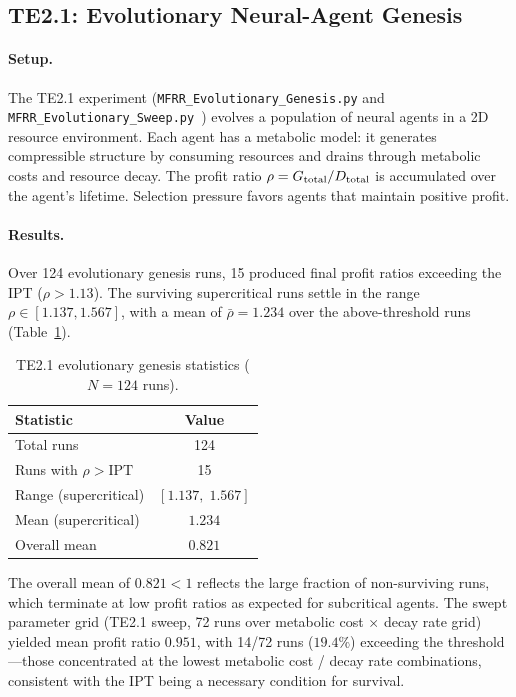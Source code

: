 \documentclass[11pt,twocolumn]{article}
\theoremstyle{remark}
\begin{document}
\subsection{TE2.1: Evolutionary Neural-Agent Genesis}
\label{sec:validation:te21}

\paragraph{Setup.}
The TE2.1 experiment (\texttt{MFRR\_Evolutionary\_Genesis.py} and
\texttt{MFRR\_Evolutionary\_Sweep.py}~\cite{ugp-physics-repo}) evolves
a population of neural agents in a 2D resource environment. Each agent
has a metabolic model: it generates compressible structure by consuming
resources and drains through metabolic costs and resource decay. The
profit ratio $\rho = G_{\rm total}/D_{\rm total}$ is accumulated over
the agent's lifetime. Selection pressure favors agents that maintain
positive profit.

\paragraph{Results.}
Over 124 evolutionary genesis runs, 15 produced final profit ratios
exceeding the IPT ($\rho > 1.13$). The surviving supercritical
runs settle in the range $\rho \in [1.137, 1.567]$, with a mean
of $\bar\rho = 1.234$ over the above-threshold runs
(Table~\ref{tab:te21}).

\begin{table}[ht]
\centering
\caption{TE2.1 evolutionary genesis statistics ($N=124$ runs).}
\label{tab:te21}
\begin{tabular}{lc}
\toprule
Statistic & Value \\
\midrule
Total runs & 124 \\
Runs with $\rho > \mathrm{IPT}$ & 15 \\
Range (supercritical) & $[1.137,\;1.567]$ \\
Mean (supercritical) & $1.234$ \\
Overall mean & $0.821$ \\
\bottomrule
\end{tabular}
\end{table}

The overall mean of $0.821 < 1$ reflects the large fraction of
non-surviving runs, which terminate at low profit ratios as expected
for subcritical agents. The swept parameter grid (TE2.1 sweep,
72 runs over metabolic cost $\times$ decay rate grid) yielded mean
profit ratio $0.951$, with 14/72 runs ($19.4\%$) exceeding the
threshold---those concentrated at the lowest metabolic cost / decay
rate combinations, consistent with the IPT being a necessary condition
for survival.
\end{document}

